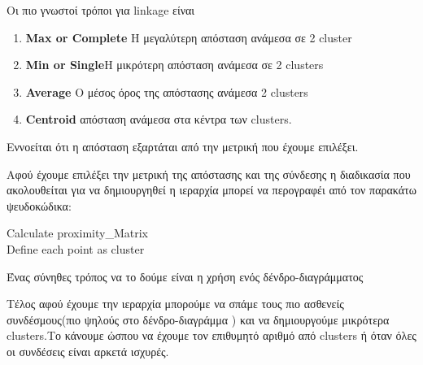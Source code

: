 Οι πιο γνωστοί τρόποι για linkage είναι 
\begin{enumerate}
\item \textbf{Max or Complete }Η μεγαλύτερη απόσταση ανάμεσα σε 2 cluster
\item \textbf{Min or Single}H μικρότερη απόσταση ανάμεσα σε 2 clusters 
\item \textbf{Average }Ο μέσος όρος της απόστασης  ανάμεσα 2 clusters 
\item \textbf{Centroid } απόσταση ανάμεσα στα κέντρα των clusters.
\end{enumerate}
Εννοείται ότι η απόσταση εξαρτάται από την μετρική που έχουμε επιλέξει.


 Αφού έχουμε επιλέξει την μετρική της απόστασης και της σύνδεσης η διαδικασία που ακολουθείται για να δημιουργηθεί η ιεραρχία μπορεί να περογραφέι από τον παρακάτω ψευδοκώδικα:
 \newline 
 \indent
\begin{algorithm}[H]
Calculate proximity\_Matrix\\
Define each point as cluster\\
\end{algorithm}

\begin{minipage}{\linewidth}%
Ένας σύνηθες τρόπος να το δούμε είναι η  χρήση ενός δένδρο-διαγράμματος
\label{fig:dentro1}%
\end{minipage}
 
Τέλος αφού έχουμε την ιεραρχία μπορούμε να σπάμε τους πιο ασθενείς συνδέσμους(πιο ψηλούς στο δένδρο-διαγράμμα ) και να δημιουργούμε μικρότερα clusters.Το κάνουμε ώσπου να έχουμε τον επιθυμητό αριθμό από clusters
ή όταν όλες οι συνδέσεις είναι αρκετά ισχυρές.


